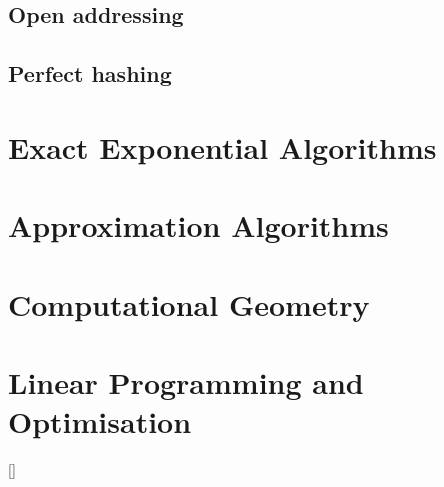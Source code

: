 \documentclass[12pt]{article}
\begin{document}
\subsection{Open addressing}
\subsection{Perfect hashing}
\newpage

\section{Exact Exponential Algorithms}
\newpage

\section{Approximation Algorithms}
\newpage

\section{Computational Geometry}
\newpage

\section{Linear Programming and Optimisation}
[\cite{monoids}]

\newpage

%



\end{document}
